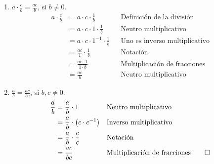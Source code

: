 \documentclass[11pt]{article}
\begin{document}
\begin{enumerate}[label=\alph*)]
\begin{enumerate}[label=\roman*)]
        \item $a \cdot \frac{c}{b} = \frac{ac}{b}$, si $b \neq 0$.
        \begin{align*}
            a\cdot \frac{c}{b} &= a\cdot c \cdot \frac{1}{b} && \text{Definición de la división}\\
            &= a\cdot c \cdot 1 \cdot \frac{1}{b} && \text{Neutro multiplicativo}\\
            &= a\cdot c\cdot 1^{-1} \cdot \frac{1}{b} && \text{Uno es inverso multiplicativo}\\
            &= \frac{ac}{1} \cdot \frac{1}{b} && \text{Notación}\\
            &= \frac{ac\cdot 1}{1\cdot b} && \text{Multiplicación de fracciones}\\
            &= \frac{ac}{b} && \text{Neutro multiplicativo}
        \end{align*}
        
        \item $\frac{a}{b} = \frac{ac}{bc}$, si $b,c \neq 0$.\begin{align*}
            \frac{a}{b}&=\frac{a}{b}\cdot 1 && \text{Neutro multiplicativo}\\
            &= \frac{a}{b}\cdot \bigl(c \cdot c^{-1}\bigr) && \text{Inverso multiplicativo}\\
            &= \frac{a}{b} \cdot \frac{c}{c} && \text{Notación}\\
            &= \frac{ac}{bc} && \text{Multiplicación de fracciones} \qedhere
        \end{align*}
    \end{enumerate} %


\end{enumerate}
\end{document}
